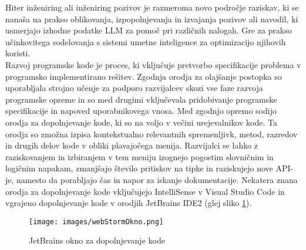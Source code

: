 \documentclass[a4paper,12pt,openright]{book}
\begin{document}
Hiter inženiring ali inženiring pozivov je razmeroma novo področje raziskav, ki se nanaša na prakso oblikovanja, izpopolnjevanja in izvajanja pozivov ali navodil, ki usmerjajo izhodne podatke LLM za pomoč pri različnih nalogah. Gre za prakso učinkovitega sodelovanja s sistemi umetne inteligence za optimizacijo njihovih koristi. \cite{info:doi/10.2196/50638} \\
Razvoj programske kode je proces, ki vključuje pretvorbo specifikacije problema v programsko implementirano rešitev. Zgodnja orodja za olajšanje postopka so uporabljala strojno učenje za podporo razvijalcev skozi vse faze razvoja programske opreme in so med drugimi vključevala pridobivanje programske specifikacije in napoved uporabnikovega vnosa.
Med zgodnjo opremo sodijo orodja za dopolnjevanje kode, ki so na voljo v večini urejevalnikov kode. Ta orodja so zmožna izpisa kontekstualno relevantnih spremenljivk, metod, razredov in drugih delov kode v obliki plavajočega menija. Razvijalci se lahko z raziskovanjem in izbiranjem v tem meniju izognejo pogostim slovničnim in logičnim napakam, zmanjšajo število pritiskov na tipke in raziskujejo nove API-je, namesto da porabljajo čas in napor za iskanje dokumentacije. Nekatera znana orodja za dopolnjevanje kode vključujejo IntelliSense v Visual Studio Code in vgrajeno dopolnjevanje kode v orodjih JetBrains IDE2 (glej sliko \ref{fig:jetBrainsOkno}). \cite{hu2019re} \\
\begin{figure}[H]
    \centering
    \texttt{[image: images/webStormOkno.png]}
    \caption{JetBrains okno za dopolnjevanje kode}
    \label{fig:jetBrainsOkno}
\end{figure}
\end{document}
